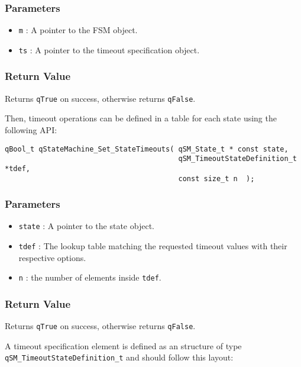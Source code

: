 \subsubsection*{Parameters}
\begin{itemize}
    \item \lstinline{m} : A pointer to the FSM object. 
    \item \lstinline{ts} : A pointer to the timeout specification object.
\end{itemize}

\subsubsection*{Return Value}
Returns \lstinline{qTrue} on success, otherwise returns \lstinline{qFalse}.

\hrulefill

Then, timeout operations can be defined in a table for each state using the following  API:

\begin{lstlisting}[style=CStyle]
qBool_t qStateMachine_Set_StateTimeouts( qSM_State_t * const state, 
                                         qSM_TimeoutStateDefinition_t *tdef, 
                                         const size_t n  );
\end{lstlisting} 

\subsubsection*{Parameters}
\begin{itemize}
    \item \lstinline{state} : A pointer to the state object. 
    \item \lstinline{tdef} : The lookup table matching the requested timeout values with their respective options.
    \item \lstinline{n} : the number of elements inside \lstinline{tdef}.
\end{itemize}

\subsubsection*{Return Value}
Returns \lstinline{qTrue} on success, otherwise returns \lstinline{qFalse}.

A timeout specification element  is defined as an structure of type \lstinline{qSM_TimeoutStateDefinition_t} and should follow this layout:

